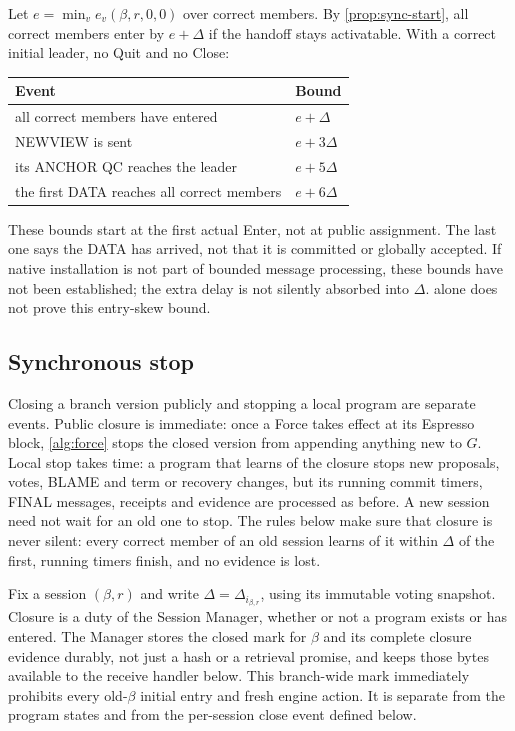 \documentclass[11pt,a4paper]{article}
\begin{document}
Let $e=\min_v e_v(\beta,r,0,0)$ over correct members. By
\cref{prop:sync-start}, all correct members enter by $e+\Delta$ if the
handoff stays activatable. With a correct initial leader, no Quit and no
Close:
\begin{center}\small
\begin{tabular}{@{}ll@{}}\toprule
Event & Bound\\\midrule
all correct members have entered & $e+\Delta$\\
NEWVIEW is sent & $e+3\Delta$\\
its ANCHOR QC reaches the leader & $e+5\Delta$\\
the first DATA reaches all correct members & $e+6\Delta$\\\bottomrule
\end{tabular}
\end{center}
These bounds start at the first actual Enter, not at public
assignment. The last one says the DATA has arrived, not that it
is committed or globally accepted. If native installation is not part of
bounded message processing, these bounds have not been established; the
extra delay is not silently absorbed into $\Delta$. 
alone does not prove this entry-skew bound.


\subsection{Synchronous stop}
\label{sec:retirement}
\label{sec:runtime-close}
Closing a branch version publicly and stopping a local program are
separate events. Public closure is immediate: once a Force takes effect
at its Espresso block, \cref{alg:force} stops the closed version from
appending anything new to $G$. Local stop takes time: a program that
learns of the closure stops new proposals, votes, BLAME and term or
recovery changes, but its running commit timers, FINAL messages,
receipts and evidence are processed as before. A new session need not
wait for an old one to stop. The rules below make sure that closure is
never silent: every correct member of an old session learns of it within
$\Delta$ of the first, running timers finish, and no evidence is lost.

Fix a session $(\beta,r)$ and write $\Delta=\Delta_{i_{\beta,r}}$,
using its immutable voting snapshot. Closure is a duty of the Session
Manager, whether or not a program exists or has entered. The Manager
stores the closed mark for $\beta$ and its complete closure evidence
durably, not just a hash or a retrieval promise, and keeps those bytes
available to the receive handler below. This branch-wide mark
immediately prohibits every old-$\beta$ initial entry and fresh
engine action. It is separate from the program states and from the
per-session close event defined below.
\end{document}
